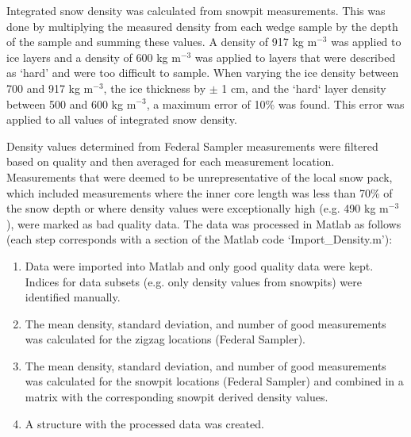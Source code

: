 \documentclass[12pt]{article}
\begin{document}
Integrated snow density was calculated from snowpit measurements. This was done by multiplying the measured density from each wedge sample by the depth of the sample and summing these values. A density of 917 kg m$^{-3}$ was applied to ice layers and a density of 600 kg m$^{-3}$ was applied to layers that were described as `hard' and were too difficult to sample. When varying the ice density between 700 and 917 kg m$^{-3}$, the ice thickness by $\pm$ 1 cm, and the `hard` layer density between 500 and 600 kg m$^{-3}$, a maximum error of 10\% was found. This error was applied to all values of integrated snow density.

Density values determined from Federal Sampler measurements were filtered based on quality and then averaged for each measurement location. Measurements that were deemed to be unrepresentative of the local snow pack, which included measurements where the inner core length was less than 70\% of the snow depth or where density values were exceptionally high (e.g. 490 kg m$^{-3}$), were marked as bad quality data. The data was processed in Matlab as follows (each step corresponds with a section of the Matlab code `Import\_Density.m'): 
\begin{enumerate}
\item Data were imported into Matlab and only good quality data were kept. Indices for data subsets (e.g. only density values from snowpits) were identified manually. 
\item The mean density, standard deviation, and number of good measurements was calculated for the zigzag locations (Federal Sampler).
\item The mean density, standard deviation, and number of good measurements was calculated for the snowpit locations (Federal Sampler) and combined in a matrix with the corresponding snowpit derived density values.
\item A structure with the processed data was created.
\end{enumerate}
\end{document}
